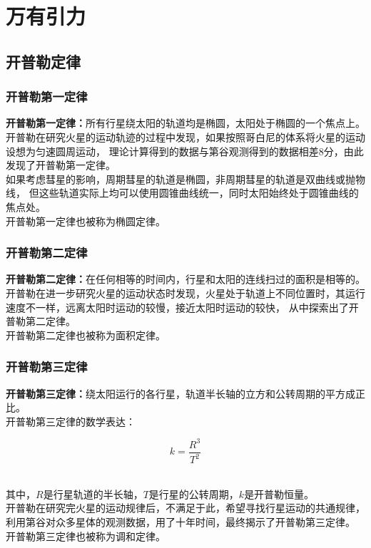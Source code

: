 \documentclass[UTF8]{ctexart}
\begin{document}
\section{万有引力}

\subsection{开普勒定律}

\subsubsection{开普勒第一定律}
    \textbf{开普勒第一定律：}所有行星绕太阳的轨道均是椭圆，太阳处于椭圆的一个焦点上。\\[3mm]
    开普勒在研究火星的运动轨迹的过程中发现，如果按照哥白尼的体系将火星的运动设想为匀速圆周运动，
    理论计算得到的数据与第谷观测得到的数据相差$8$分，由此发现了开普勒第一定律。\\[3mm]
    如果考虑彗星的影响，周期彗星的轨道是椭圆，非周期彗星的轨道是双曲线或抛物线，
    但这些轨道实际上均可以使用圆锥曲线统一，同时太阳始终处于圆锥曲线的焦点处。\\[3mm]
    开普勒第一定律也被称为椭圆定律。\\

\subsubsection{开普勒第二定律}
    \textbf{开普勒第二定律：}在任何相等的时间内，行星和太阳的连线扫过的面积是相等的。\\[3mm]
    开普勒在进一步研究火星的运动状态时发现，火星处于轨道上不同位置时，其运行速度不一样，远离太阳时运动的较慢，接近太阳时运动的较快，
    从中探索出了开普勒第二定律。\\[3mm]
    开普勒第二定律也被称为面积定律。\\

\subsubsection{开普勒第三定律}
    \textbf{开普勒第三定律：}绕太阳运行的各行星，轨道半长轴的立方和公转周期的平方成正比。\\[3mm]
    开普勒第三定律的数学表达：
    \begin{large}
        \begin{equation*}
            k=\frac{R^3}{T^2}
        \end{equation*}
    \end{large}\\
    其中，$R$是行星轨道的半长轴，$T$是行星的公转周期，$k$是开普勒恒量。\\[4mm]
    开普勒在研究完火星的运动规律后，不满足于此，希望寻找行星运动的共通规律，
    利用第谷对众多星体的观测数据，用了十年时间，最终揭示了开普勒第三定律。\\[3mm]
    开普勒第三定律也被称为调和定律。
\end{document}
